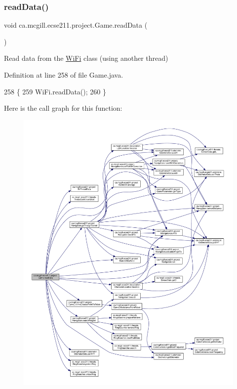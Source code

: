 \subsubsection{\texorpdfstring{read\+Data()}{readData()}}
{\footnotesize\ttfamily void ca.\+mcgill.\+ecse211.\+project.\+Game.\+read\+Data (\begin{DoxyParamCaption}{ }\end{DoxyParamCaption})}

Read data from the \hyperlink{enumca_1_1mcgill_1_1ecse211_1_1project_1_1_wi_fi}{Wi\+Fi} class (using another thread) 

Definition at line 258 of file Game.\+java.


\begin{DoxyCode}
258                          \{
259     WiFi.readData();
260   \}
\end{DoxyCode}
Here is the call graph for this function\+:
\nopagebreak
\begin{figure}[H]
\begin{center}
\leavevmode
\includegraphics[width=350pt]{enumca_1_1mcgill_1_1ecse211_1_1project_1_1_game_a032b53e9b16b9d470b461de4a311a698_cgraph}
\end{center}
\end{figure}
\mbox{\label{enumca_1_1mcgill_1_1ecse211_1_1project_1_1_game_a5b304a6a59ddee3f8c7d37bba8a4c129}} 
